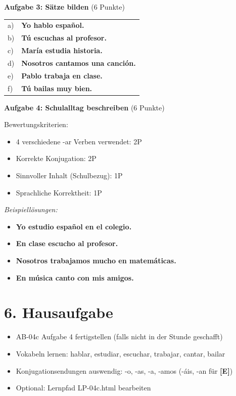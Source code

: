 \documentclass[11pt, a4paper]{article}
\newcommand{\sequenz}{04}
\newcommand{\block}{c}
\newcommand{\E}{\textcolor{erweiterung}{\textbf{[E]}}}
\newcommand{\loesung}[1]{\textcolor{loesung}{\textbf{#1}}}
\begin{document}
\textbf{Aufgabe 3: Sätze bilden} (6 Punkte)

\begin{tabular}{ll}
a) & \loesung{Yo hablo español.} \\
b) & \loesung{Tú escuchas al profesor.} \\
c) & \loesung{María estudia historia.} \\
d) & \loesung{Nosotros cantamos una canción.} \\
e) & \loesung{Pablo trabaja en clase.} \\
f) & \loesung{Tú bailas muy bien.} \\
\end{tabular}

\vspace{1em}

\textbf{Aufgabe 4: Schulalltag beschreiben} (6 Punkte)

Bewertungskriterien:
\begin{itemize}
    \item 4 verschiedene -ar Verben verwendet: 2P
    \item Korrekte Konjugation: 2P
    \item Sinnvoller Inhalt (Schulbezug): 1P
    \item Sprachliche Korrektheit: 1P
\end{itemize}

\textit{Beispiellösungen:}
\begin{itemize}
    \item \loesung{Yo estudio español en el colegio.}
    \item \loesung{En clase escucho al profesor.}
    \item \loesung{Nosotros trabajamos mucho en matemáticas.}
    \item \loesung{En música canto con mis amigos.}
\end{itemize}


\section*{6. Hausaufgabe}

\begin{itemize}
    \item AB-04c Aufgabe 4 fertigstellen (falls nicht in der Stunde geschafft)
    \item Vokabeln lernen: hablar, estudiar, escuchar, trabajar, cantar, bailar
    \item Konjugationsendungen auswendig: -o, -as, -a, -amos (-áis, -an für \E{})
    \item Optional: Lernpfad LP-\sequenz\block.html bearbeiten
\end{itemize}
\end{document}
